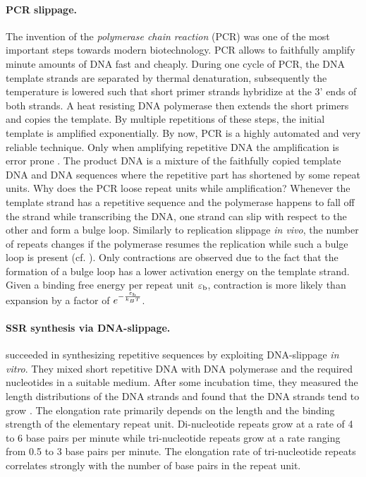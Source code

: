 \paragraph{{\label{sec:PCR_slippage}PCR slippage.}}
The invention of the \emph{polymerase chain reaction} (PCR) was one of the most important steps
towards modern biotechnology. PCR allows to faithfully amplify minute amounts of DNA fast and cheaply.
During one cycle of PCR, the DNA template strands are separated by thermal denaturation, subsequently
the temperature is lowered such that short primer strands hybridize at the 3' ends of both strands.
A heat resisting DNA polymerase then extends the short primers and copies the template. By
multiple repetitions of these steps, the initial template is amplified exponentially.  
By now, PCR is a highly automated and very reliable technique. 
Only when amplifying repetitive DNA
the amplification is error prone \cite{Hauge_HumMolGenet_93, Murray_NAR_93}. The
product DNA is a mixture of the faithfully copied template DNA and DNA sequences where the
repetitive part has shortened by some repeat units. 
Why does the PCR loose repeat units while amplification?
Whenever the template strand has a repetitive sequence and the polymerase happens to fall
off the strand while transcribing the DNA, one strand can slip with respect to the other and 
form a bulge loop. Similarly to replication slippage \emph{in vivo}, the number of repeats changes 
if the polymerase resumes the replication while such a bulge loop
is present (cf. ). 
Only contractions are observed due to the fact that the formation of a bulge loop has a lower
activation energy on the template strand.
Given a binding free energy per repeat unit ${\varepsilon_{\rm b}}$, contraction is more likely than expansion
by a factor of $e^{-\frac{{\varepsilon_{\rm b}}}{k_BT}}$. 

\paragraph{\label{sec:in_vitro_slippage}SSR synthesis via DNA-slippage.}
\citeauthor{Schloetterer_NAR_92} succeeded in synthesizing repetitive sequences by exploiting 
DNA-slippage \emph{in vitro}. They mixed short repetitive DNA with DNA 
polymerase and the required nucleotides in a suitable medium. After some incubation time, 
they measured the length distributions of the DNA strands and found that the DNA
strands tend to grow \cite{Schloetterer_NAR_92}.  The elongation rate primarily depends 
on the length and the binding strength of the elementary repeat unit. 
Di-nucleotide repeats grow at a rate of 4 to 6 base pairs per minute while  tri-nucleotide repeats 
grow at a rate ranging from  0.5 to 3 base pairs per minute.
The elongation rate  of tri-nucleotide repeats correlates strongly with the number of 
 base pairs in the repeat unit.


